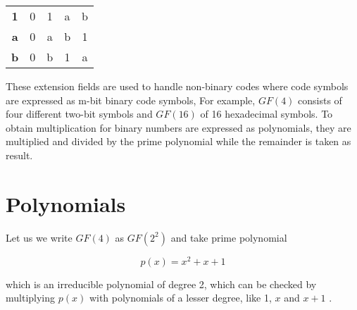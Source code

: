 \documentclass[../main.tex]{subfiles}
\begin{document}
\begin{table}[htp]
\begin{center}
{\begin{minipage}[t]{0.475\textwidth}
\begin{tabular}{c | c c c c}
                        \textbf{1}  & 0             & 1             & a             & b \\
                        \textbf{a}  & 0             & a             & b             & 1 \\
                        \textbf{b}  & 0             & b             & 1             & a \\
                    \end{tabular}
                \end{minipage}
            }
        \end{center}
    \end{table}

    These extension fields are used to handle non-binary codes where code symbols are expressed as m-bit binary code symbols, For example, $GF(4)$ consists of four different two-bit symbols and $GF(16)$ of 16 hexadecimal symbols. To obtain multiplication for binary numbers are expressed as polynomials, they are multiplied and divided by the prime polynomial while the remainder is taken as result.


    \section{Polynomials}
    Let us we write $GF(4)$ as $GF(2^2)$ and take prime polynomial

    \begin{equation*}
        p(x) = x^2 + x + 1
    \end{equation*}

    \noindent
    which is an irreducible polynomial of degree 2, which can be checked by multiplying $p(x)$ with polynomials of a lesser degree, like 1, $x$ and $x+1$ \autocite{blahut1983theory}.
\end{document}
